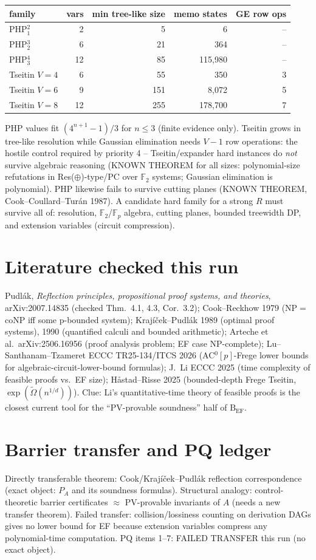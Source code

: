 \documentclass[11pt]{article}
\begin{document}
\begin{center}\begin{tabular}{lrrrr}
family & vars & min tree-like size & memo states & GE row ops\\\hline
PHP$^{2}_{1}$ & 2 & 5 & 6 & --\\
PHP$^{3}_{2}$ & 6 & 21 & 364 & --\\
PHP$^{4}_{3}$ & 12 & 85 & 115{,}980 & --\\
Tseitin $V=4$ & 6 & 55 & 350 & 3\\
Tseitin $V=6$ & 9 & 151 & 8{,}072 & 5\\
Tseitin $V=8$ & 12 & 255 & 178{,}700 & 7
\end{tabular}\end{center}
PHP values fit $(4^{n+1}-1)/3$ for $n\le3$ (finite evidence only). Tseitin grows in tree-like resolution while
Gaussian elimination needs $V-1$ row operations: the hostile control required by priority 4 --
Tseitin/expander hard instances do \emph{not} survive algebraic reasoning (KNOWN THEOREM for all sizes:
polynomial-size refutations in Res($\oplus$)-type/PC over $\mathbb F_2$ systems; Gaussian elimination is
polynomial). PHP likewise fails to survive cutting planes (KNOWN THEOREM, Cook--Coullard--Turán 1987).
A candidate hard family for a strong $R$ must survive all of: resolution, $\mathbb F_2$/$\mathbb F_p$ algebra,
cutting planes, bounded treewidth DP, and extension variables (circuit compression).

\section{Literature checked this run}
Pudlák, \emph{Reflection principles, propositional proof systems, and theories}, arXiv:2007.14835 (checked
Thm.~4.1, 4.3, Cor.~3.2); Cook--Reckhow 1979 (NP$=$coNP iff some p-bounded system); Krajíček--Pudlák 1989 (optimal
proof systems), 1990 (quantified calculi and bounded arithmetic); Arteche et al.\ arXiv:2506.16956 (proof analysis
problem; EF case NP-complete); Lu--Santhanam--Tzameret ECCC TR25-134/ITCS 2026 (AC$^0[p]$-Frege lower bounds for
algebraic-circuit-lower-bound formulas); J.~Li ECCC 2025 (time complexity of feasible proofs vs.\ EF size);
Håstad--Risse 2025 (bounded-depth Frege Tseitin, $\exp(\tilde\Omega(n^{1/d}))$). Clue: Li's quantitative-time
theory of feasible proofs is the closest current tool for the ``PV-provable soundness'' half of $\mathrm B_{\mathrm{EF}}$.

\section{Barrier transfer and PQ ledger}
Directly transferable theorem: Cook/Krajíček--Pudlák reflection correspondence (exact object: $P_A$ and its
soundness formulas). Structural analogy: control-theoretic barrier certificates $\approx$ PV-provable invariants of $A$
(needs a new transfer theorem). Failed transfer: collision/lossiness counting on derivation DAGs gives no
lower bound for EF because extension variables compress any polynomial-time computation. PQ items 1--7: FAILED
TRANSFER this run (no exact object).
\end{document}
